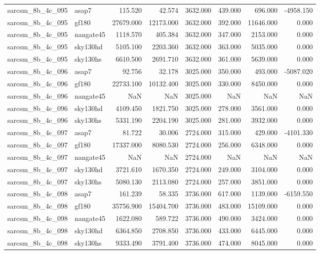 \begin{tabular}{llrrrrrr}
sarcsm\_8b\_4c\_095 & asap7 & 115.520 & 42.574 & 3632.000 & 439.000 & 696.000 & -4958.150 \\
sarcsm\_8b\_4c\_095 & gf180 & 27679.000 & 12173.000 & 3632.000 & 392.000 & 11646.000 & 0.000 \\
sarcsm\_8b\_4c\_095 & nangate45 & 1118.570 & 405.384 & 3632.000 & 347.000 & 2153.000 & 0.000 \\
sarcsm\_8b\_4c\_095 & sky130hd & 5105.100 & 2203.360 & 3632.000 & 363.000 & 5035.000 & 0.000 \\
sarcsm\_8b\_4c\_095 & sky130hs & 6610.500 & 2691.710 & 3632.000 & 361.000 & 5639.000 & 0.000 \\
sarcsm\_8b\_4c\_096 & asap7 & 92.756 & 32.178 & 3025.000 & 350.000 & 493.000 & -5087.020 \\
sarcsm\_8b\_4c\_096 & gf180 & 22733.100 & 10132.400 & 3025.000 & 330.000 & 8450.000 & 0.000 \\
sarcsm\_8b\_4c\_096 & nangate45 & NaN & NaN & 3025.000 & NaN & NaN & NaN \\
sarcsm\_8b\_4c\_096 & sky130hd & 4109.450 & 1821.750 & 3025.000 & 278.000 & 3561.000 & 0.000 \\
sarcsm\_8b\_4c\_096 & sky130hs & 5331.190 & 2204.190 & 3025.000 & 281.000 & 3932.000 & 0.000 \\
sarcsm\_8b\_4c\_097 & asap7 & 81.722 & 30.006 & 2724.000 & 315.000 & 429.000 & -4101.330 \\
sarcsm\_8b\_4c\_097 & gf180 & 17337.000 & 8080.530 & 2724.000 & 256.000 & 6348.000 & 0.000 \\
sarcsm\_8b\_4c\_097 & nangate45 & NaN & NaN & 2724.000 & NaN & NaN & NaN \\
sarcsm\_8b\_4c\_097 & sky130hd & 3721.610 & 1670.350 & 2724.000 & 249.000 & 3104.000 & 0.000 \\
sarcsm\_8b\_4c\_097 & sky130hs & 5080.130 & 2113.080 & 2724.000 & 257.000 & 3851.000 & 0.000 \\
sarcsm\_8b\_4c\_098 & asap7 & 161.239 & 58.335 & 3736.000 & 617.000 & 1139.000 & -6159.550 \\
sarcsm\_8b\_4c\_098 & gf180 & 35756.900 & 15404.700 & 3736.000 & 483.000 & 15109.000 & 0.000 \\
sarcsm\_8b\_4c\_098 & nangate45 & 1622.080 & 589.722 & 3736.000 & 490.000 & 3424.000 & 0.000 \\
sarcsm\_8b\_4c\_098 & sky130hd & 6364.850 & 2708.850 & 3736.000 & 433.000 & 6445.000 & 0.000 \\
sarcsm\_8b\_4c\_098 & sky130hs & 9333.490 & 3791.400 & 3736.000 & 474.000 & 8045.000 & 0.000 \\

\end{tabular}
